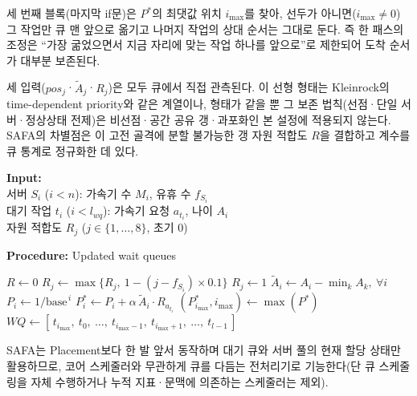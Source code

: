 \documentclass{ieeetj}
\begin{document}
세 번째 블록(마지막 if문)은 $P^*$의 최댓값 위치 $i_{\max}$를 찾아, 선두가 아니면($i_{\max}\neq0$) 그 작업만 큐 맨 앞으로 옮기고 나머지 작업의 상대 순서는 그대로 둔다. 즉 한 패스의 조정은 ``가장 굶었으면서 지금 자리에 맞는 작업 하나를 앞으로''로 제한되어 도착 순서가 대부분 보존된다.

세 입력($pos_j$·$\tilde A_j$·$R_j$)은 모두 큐에서 직접 관측된다. 이 선형 형태는 Kleinrock의 time-dependent priority\cite{kleinrock1976queueing}와 같은 계열이나, 형태가 같을 뿐 그 보존 법칙(선점·단일 서버·정상상태 전제)은 비선점·공간 공유 갱·과포화인 본 설정에 적용되지 않는다. SAFA의 차별점은 이 고전 골격에 분할 불가능한 갱 자원 적합도 $R$을 결합하고 계수를 큐 통계로 정규화한 데 있다.

\begin{algorithm}
\caption{Starvation-Aware Queue Adjustment}\label{alg:adjust_wait_queue}
\textbf{Input:} \\
\hspace*{4mm} 서버 $S_i$ ($i{<}n$): 가속기 수 $M_i$, 유휴 수 $f_{S_i}$ \\
\hspace*{4mm} 대기 작업 $t_i$ ($i{<}l_{wq}$): 가속기 요청 $a_{t_i}$, 나이 $A_i$ \\
\hspace*{4mm} 자원 적합도 $R_j$ ($j\in\{1,\ldots,8\}$, 초기 0)
\begin{flushleft}
\textbf{Procedure:} Updated wait queues
\end{flushleft}
\begin{algorithmic}[1]
\STATE $R \gets 0$
\STATE {}
            \STATE $R_j \gets \max\{R_j,\ 1 - ( j - f_{S_i} ) \times 0.1\}$ 
        \ELSE
            \STATE $R_j \gets 1$ 
        \ENDIF
    \ENDFOR
\ENDFOR
\STATE {}
\STATE $\tilde A_i \gets A_i - \min_k A_k,\ \forall i$ 
    \STATE $P_i \gets 1/\text{base}^{\,i}$ 
    \STATE $P_i^* \gets P_i + \alpha\, \tilde A_i \cdot R_{a_{t_i}}$
\ENDFOR
\STATE {}
\STATE $(P_{i_{\max}}^*, i_{\max}) \gets \max(P^*)$
    \STATE $WQ \gets [\,t_{i_{\max}},\ t_0,\ \ldots,\ t_{i_{\max}-1},\ t_{i_{\max}+1},\ \ldots,\ t_{l-1}\,]$
\ENDIF
\end{algorithmic}
\end{algorithm}

SAFA는 Placement보다 한 발 앞서 동작하며 대기 큐와 서버 풀의 현재 할당 상태만 활용하므로, 코어 스케줄러와 무관하게 큐를 다듬는 전처리기로 기능한다(단 큐 스케줄링을 자체 수행하거나 누적 지표·문맥에 의존하는 스케줄러는 제외).
\end{document}

